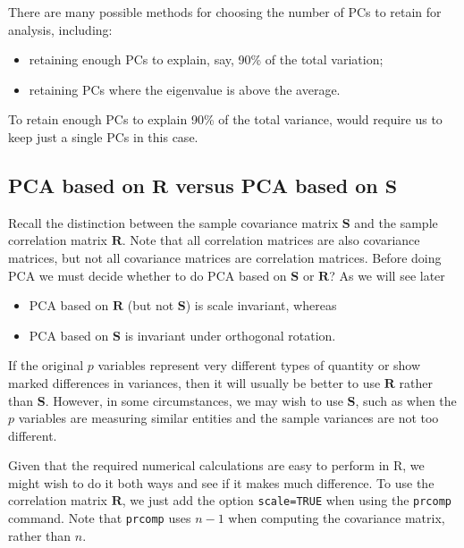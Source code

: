 \documentclass[
]{book}
\providecommand{\tightlist}{%
  \setlength{\itemsep}{0pt}\setlength{\parskip}{0pt}}
\theoremstyle{definition}
\theoremstyle{definition}
\theoremstyle{definition}
\theoremstyle{definition}
\theoremstyle{remark}
\begin{document}
There are many possible methods for choosing the number of PCs to retain for analysis, including:

\begin{itemize}
\tightlist
\item
  retaining enough PCs to explain, say, 90\% of the total variation;
\item
  retaining PCs where the eigenvalue is above the average.
\end{itemize}

To retain enough PCs to explain 90\% of the total variance, would require us to keep just a single PCs in this case.

\subsection{\texorpdfstring{PCA based on \(\mathbf R\) versus PCA based on \(\mathbf S\)}{PCA based on \textbackslash mathbf R versus PCA based on \textbackslash mathbf S}}\label{pcawithR}

Recall the distinction between the sample covariance matrix \(\mathbf S\) and the sample correlation matrix \(\mathbf R\).
Note that all correlation matrices are also covariance matrices, but not all covariance matrices are correlation matrices.
Before doing PCA we must decide whether to do PCA based on \(\mathbf S\) or \(\mathbf R\)? As we will see later

\begin{itemize}
\tightlist
\item
  PCA based on \(\mathbf R\) (but not \(\mathbf S\)) is scale invariant, whereas
\item
  PCA based on \(\mathbf S\) is invariant under orthogonal rotation.
\end{itemize}

If the original \(p\) variables represent very different types of quantity or show marked differences in variances, then it will usually be better to use \(\mathbf R\) rather than \(\mathbf S\). However, in some circumstances, we may wish to use \(\mathbf S\), such as when the \(p\) variables are measuring similar entities and the sample variances are not too different.

Given that the required numerical calculations are easy to perform in R, we might wish to do it both ways and see if it makes much difference. To use the correlation matrix \(\mathbf R\), we just add the option \texttt{scale=TRUE} when using the \texttt{prcomp} command. Note that \texttt{prcomp} uses \(n-1\) when computing the covariance matrix, rather than \(n\).
\end{document}
